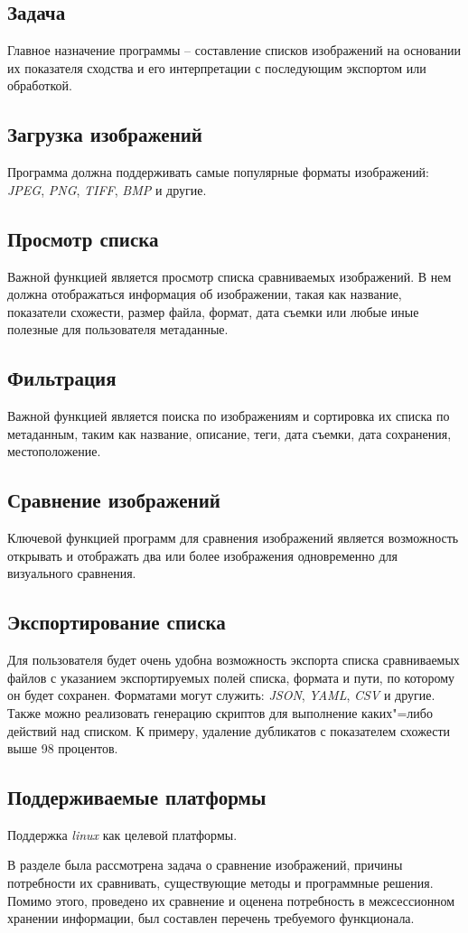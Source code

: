 \subsection{Задача}
Главное назначение программы -- составление списков изображений на основании их
показателя сходства и его интерпретации с последующим экспортом или обработкой.

\subsection{Загрузка изображений}
Программа должна поддерживать самые популярные форматы изображений:
\textit{JPEG}, \textit{PNG}, \textit{TIFF}, \textit{BMP} и другие.

\subsection{Просмотр списка}
Важной функцией является просмотр списка сравниваемых изображений. В нем должна
отображаться информация об изображении, такая как название, показатели схожести,
размер файла, формат, дата съемки или любые иные полезные для пользователя
метаданные.

\subsection{Фильтрация}
Важной функцией является поиска по изображениям и сортировка их списка по
метаданным, таким как название, описание, теги, дата съемки, дата сохранения,
местоположение.

\subsection{Сравнение изображений}
Ключевой функцией программ для сравнения изображений является возможность
открывать и отображать два или более изображения одновременно для визуального
сравнения.

\subsection{Экспортирование списка}
Для пользователя будет очень удобна возможность экспорта списка сравниваемых
файлов с указанием экспортируемых полей списка, формата и пути, по которому он
будет сохранен. Форматами могут служить: \textit{JSON}, \textit{YAML},
\textit{CSV} и другие. Также можно реализовать генерацию скриптов для выполнение
каких"=либо действий над списком. К примеру, удаление дубликатов с показателем
схожести выше 98 процентов.

\subsection{Поддерживаемые платформы}
Поддержка \textit{linux} как целевой платформы.

\vspace{\baselineskip}

В разделе была рассмотрена задача о сравнение изображений, причины потребности
их сравнивать, существующие методы и программные решения. Помимо этого,
проведено их сравнение и оценена потребность в межсессионном хранении
информации, был составлен перечень требуемого функционала.
